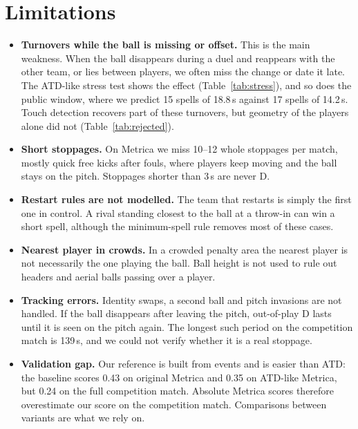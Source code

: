 \documentclass[11pt,a4paper]{article}
\begin{document}
\section{Limitations}
\label{sec:limitations}
\begin{itemize}
  \item \textbf{Turnovers while the ball is missing or offset.} This is the main weakness. When the ball disappears
    during a duel and reappears with the other team, or lies between players, we often miss the change or date it
    late. The ATD-like stress test shows the effect (Table~\ref{tab:stress}), and so does the public window, where we
    predict 15 spells of 18.8\,s against 17 spells of 14.2\,s. Touch detection recovers part of these turnovers, but
    geometry of the players alone did not (Table~\ref{tab:rejected}).
  \item \textbf{Short stoppages.} On Metrica we miss 10--12 whole stoppages per match, mostly quick free kicks after
    fouls, where players keep moving and the ball stays on the pitch. Stoppages shorter than 3\,s are never D.
  \item \textbf{Restart rules are not modelled.} The team that restarts is simply the first one in control. A rival
    standing closest to the ball at a throw-in can win a short spell, although the minimum-spell rule removes most of
    these cases.
  \item \textbf{Nearest player in crowds.} In a crowded penalty area the nearest player is not necessarily the one
    playing the ball. Ball height is not used to rule out headers and aerial balls passing over a player.
  \item \textbf{Tracking errors.} Identity swaps, a second ball and pitch invasions are not handled. If the ball
    disappears after leaving the pitch, out-of-play D lasts until it is seen on the pitch again. The longest such
    period on the competition match is 139\,s, and we could not verify whether it is a real stoppage.
  \item \textbf{Validation gap.} Our reference is built from events and is easier than ATD: the baseline scores 0.43
    on original Metrica and 0.35 on ATD-like Metrica, but 0.24 on the full competition match. Absolute Metrica scores
    therefore overestimate our score on the competition match. Comparisons between variants are what we rely on.
\end{itemize}
\end{document}

